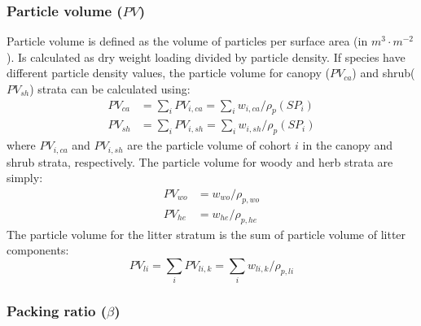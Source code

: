 \documentclass[]{book}
\begin{document}
\hypertarget{particle-volume-pv}{%
\subsubsection{\texorpdfstring{Particle volume (\(PV\))}{Particle volume (PV)}}\label{particle-volume-pv}}

Particle volume is defined as the volume of particles per surface area (in \(m^3\cdot m^{-2}\)). Is calculated as dry weight loading divided by particle density. If species have different particle density values, the particle volume for canopy (\(PV_{ca}\)) and shrub(\(PV_{sh}\)) strata can be calculated using:
\begin{eqnarray}
PV_{ca} &= \sum_{i}{PV_{i,ca}} = \sum_{i}{w_{i,ca}/\rho_{p}(SP_i)}\\
PV_{sh} &= \sum_{i}{PV_{i,sh}} = \sum_{i}{w_{i,sh}/\rho_{p}(SP_i)}
\end{eqnarray}
where \(PV_{i,ca}\) and \(PV_{i,sh}\) are the particle volume of cohort \(i\) in the canopy and shrub strata, respectively. The particle volume for woody and herb strata are simply:
\begin{eqnarray}
PV_{wo} &= w_{wo}/\rho_{p,wo}\\
PV_{he} &= w_{he}/\rho_{p,he}
\end{eqnarray}
The particle volume for the litter stratum is the sum of particle volume of litter components:
\begin{equation}
PV_{li} = \sum_{i}{PV_{li,k}} = \sum_{i}{w_{li,k}/\rho_{p, li}}
\end{equation}

\hypertarget{packing-ratio-beta}{%
\subsubsection{\texorpdfstring{Packing ratio (\(\beta\))}{Packing ratio (\textbackslash{}beta)}}\label{packing-ratio-beta}}
\end{document}
